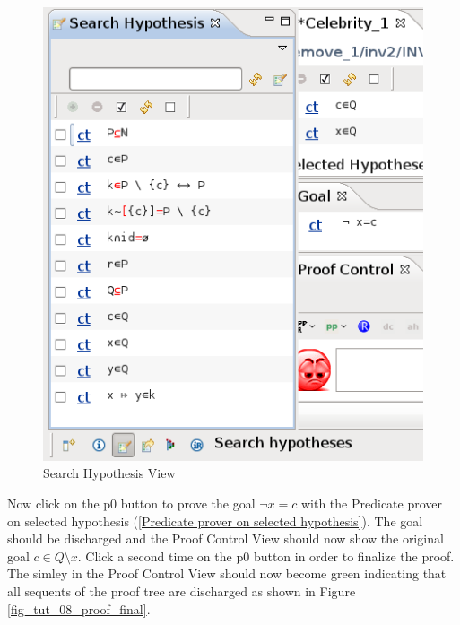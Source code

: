\begin{figure}[!h]
\begin{center}
	\includegraphics{img/tutorial/tut_08_search_hypothesis.png}
	\caption{Search Hypothesis View}
	\label{fig_tut_08_search_hypothesis}
\end{center}
\end{figure}

Now click on the \textsf{p0} button to prove the goal $\lnot x = c$ with the \textsf{Predicate prover on selected hypothesis} (\ref{Predicate prover on selected hypothesis}). The goal should be discharged and the \textsf{Proof Control View} should now show the original goal $c \in Q \setminus {x}$. Click a second time on the \textsf{p0} button in order to finalize the proof. The simley in the \textsf{Proof Control View} should now become green indicating that all sequents of the proof tree are discharged as shown in Figure \ref{fig_tut_08_proof_final}.

